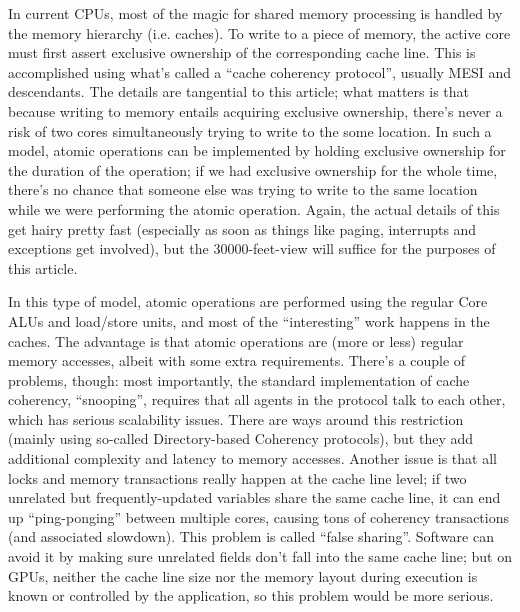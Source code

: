 \documentclass[12pt]{article}
\begin{document}
In current CPUs, most of the magic for shared memory processing is handled by the memory hierarchy (i.e. caches). To write to a piece of memory, the active core must first assert exclusive ownership of the corresponding cache line. This is accomplished using what’s called a “cache coherency protocol”, usually MESI and descendants. The details are tangential to this article; what matters is that because writing to memory entails acquiring exclusive ownership, there’s never a risk of two cores simultaneously trying to write to the some location. In such a model, atomic operations can be implemented by holding exclusive ownership for the duration of the operation; if we had exclusive ownership for the whole time, there’s no chance that someone else was trying to write to the same location while we were performing the atomic operation. Again, the actual details of this get hairy pretty fast (especially as soon as things like paging, interrupts and exceptions get involved), but the 30000-feet-view will suffice for the purposes of this article.

In this type of model, atomic operations are performed using the regular Core ALUs and load/store units, and most of the “interesting” work happens in the caches. The advantage is that atomic operations are (more or less) regular memory accesses, albeit with some extra requirements. There’s a couple of problems, though: most importantly, the standard implementation of cache coherency, “snooping”, requires that all agents in the protocol talk to each other, which has serious scalability issues. There are ways around this restriction (mainly using so-called Directory-based Coherency protocols), but they add additional complexity and latency to memory accesses. Another issue is that all locks and memory transactions really happen at the cache line level; if two unrelated but frequently-updated variables share the same cache line, it can end up “ping-ponging” between multiple cores, causing tons of coherency transactions (and associated slowdown). This problem is called “false sharing”. Software can avoid it by making sure unrelated fields don’t fall into the same cache line; but on GPUs, neither the cache line size nor the memory layout during execution is known or controlled by the application, so this problem would be more serious.
\end{document}
